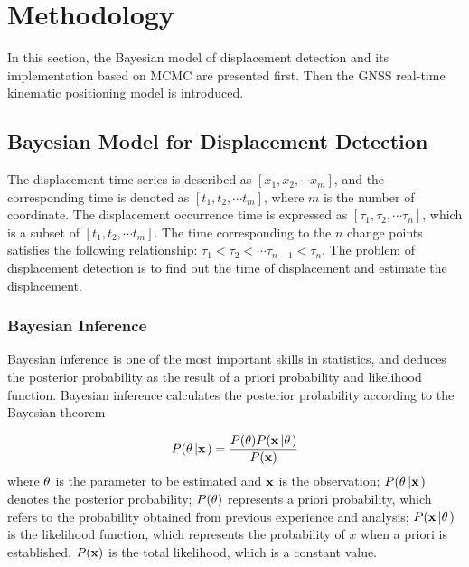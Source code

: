 \documentclass[final,3p,times]{elsarticle}
\begin{document}
	
	\section{Methodology}
	\label{method}
	In this section, the Bayesian model of displacement detection and its implementation based on MCMC are presented first. Then the GNSS  real-time kinematic positioning model is introduced.
	\subsection{Bayesian Model for Displacement Detection}
	
	
	The displacement time series is described as $\left[ {{x_1},{x_2}, \cdots {x_m}} \right]$, and the corresponding time is denoted as $\left[ {{t_1},{t_2}, \cdots {t_m}} \right]$, where $m$ is the number of coordinate. The displacement occurrence time is expressed as $\left[ {{\tau _1},{\tau _2}, \cdots {\tau _n}} \right]$, which is a subset of $\left[ {{t_1},{t_2}, \cdots {t_m}} \right]$.  
	The time corresponding to the $n$ change points satisfies the following relationship: $ {{\tau _1}<{\tau _2}<\cdots {\tau _{n-1}}<{\tau _n}} $.
	The problem of displacement detection is to find out the time of displacement and estimate the displacement.
	
	\subsubsection{Bayesian Inference}
	Bayesian inference is one of the most important skills in statistics, and deduces the posterior probability as the result of a priori probability and likelihood function\cite{robert2014machine}. Bayesian inference calculates the posterior probability according to the Bayesian theorem\cite{chen2009modulation,chen2013bayesian}
	
	\begin{equation}\label{eq_bayesian_inference}
	P({\bf{\theta }}\left| {\bf{x}} \right.) = \frac{{P({\bf{\theta }})P({\bf{x}}\left| {\bf{\theta }} \right.)}}{{P({\bf{x}})}}
	\end{equation}
	where $\bf{\theta }$ is the parameter to be estimated and $\bf{x}$ is the observation; $P({\bf{\theta }}\left| {\bf{x}} \right.)$ denotes the posterior probability; $P({\bf{\theta }})$ represents a priori probability, which refers to the probability obtained from previous experience and analysis;
	$P({\bf{x}}\left| {\bf{\theta }} \right.)$ is the likelihood function, which represents the probability of $x$ when a priori is established. ${P({\bf{x}})}$ is the total likelihood, which is a constant value.
	
\end{document}
